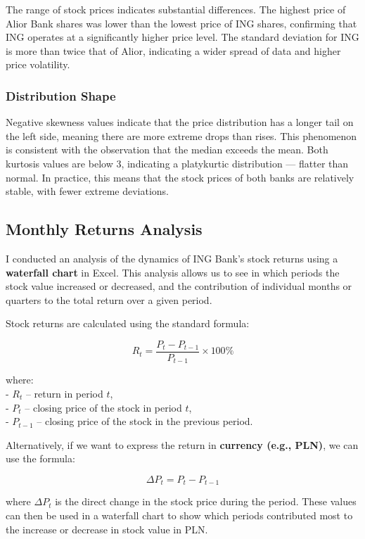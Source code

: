 \documentclass[
]{article}
\begin{document}
The range of stock prices indicates substantial differences. The highest
price of Alior Bank shares was lower than the lowest price of ING
shares, confirming that ING operates at a significantly higher price
level. The standard deviation for ING is more than twice that of Alior,
indicating a wider spread of data and higher price volatility.

\subsubsection{Distribution Shape}\label{distribution-shape}

Negative skewness values indicate that the price distribution has a
longer tail on the left side, meaning there are more extreme drops than
rises. This phenomenon is consistent with the observation that the
median exceeds the mean. Both kurtosis values are below 3, indicating a
platykurtic distribution --- flatter than normal. In practice, this
means that the stock prices of both banks are relatively stable, with
fewer extreme deviations.

\subsection{Monthly Returns Analysis}\label{monthly-returns-analysis}

I conducted an analysis of the dynamics of ING Bank's stock returns
using a \textbf{waterfall chart} in Excel. This analysis allows us to
see in which periods the stock value increased or decreased, and the
contribution of individual months or quarters to the total return over a
given period.

Stock returns are calculated using the standard formula:

\[
R_t = \frac{P_t - P_{t-1}}{P_{t-1}} \times 100\%
\]

where:\\
- \(R_t\) -- return in period \(t\),\\
- \(P_t\) -- closing price of the stock in period \(t\),\\
- \(P_{t-1}\) -- closing price of the stock in the previous period.

Alternatively, if we want to express the return in \textbf{currency
(e.g., PLN)}, we can use the formula:

\[
\Delta P_t = P_t - P_{t-1}
\]

where \(\Delta P_t\) is the direct change in the stock price during the
period. These values can then be used in a waterfall chart to show which
periods contributed most to the increase or decrease in stock value in
PLN.
\end{document}
